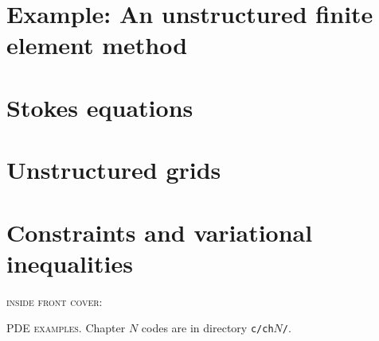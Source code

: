 \documentclass{tufte-book}
\newcommand{\CODELOC}{}  %
\newcommand{\stubinput}[2]{}
\newcommand{\stubinput}[2]{\vspace{5cm} \centerline{\LARGE Percent completed:  \Huge #2\%.} \vfill}
\theoremstyle{definition}
\begin{document}
\chapter{Example: An unstructured finite element method}
\label{chap:un}
\renewcommand{\CODELOC}{ch10/}


\chapter{Stokes equations}
\label{chap:ok}
\renewcommand{\CODELOC}{ch11/}


\chapter{Unstructured grids}
\label{chap:dp}
\renewcommand{\CODELOC}{ch12/}
\stubinput{chaps/dmplex.tex}{0}

\chapter{Constraints and variational inequalities}
\label{chap:co}
\renewcommand{\CODELOC}{ch13/}
\stubinput{chaps/constrained.tex}{20}
%


\backmatter




\clearpage

\newcommand{\tblockeqncode}[3]{
\begin{tabular}[t]{l} #1 \\ \quad {\normalsize \texttt{#3}} \\ \qquad \fbox{\small #2} \end{tabular}
}
\newcommand{\tblockcode}[2]{
\begin{tabular}[t]{l} #1 \\ \quad {\normalsize \texttt{#2}} \end{tabular}
}
\newcommand{\tblock}[1]{
\begin{tabular}[t]{l} #1 \end{tabular}
}

\clearpage
\thispagestyle{empty}
\noindent \textsc{inside front cover:}

\vfill
{\large \noindent \textsc{PDE examples}.} \quad Chapter $N$ codes are in directory \texttt{c/ch}$N$\texttt{/}.
\end{document}
